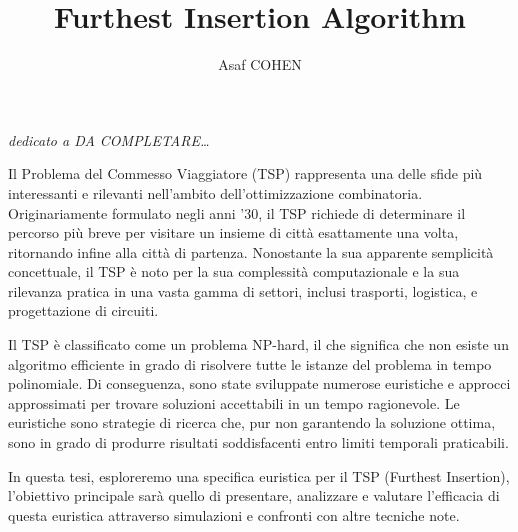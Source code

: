 \documentclass[a4paper,12pt]{report}
\begin{document}
\title{Furthest Insertion Algorithm}
\author{Asaf COHEN}
%
% 
%

\beforepreface

\clearpage
\null
\thispagestyle{empty}
\clearpage

        {\hfill \Large {\sl dedicato a DA COMPLETARE\dots}}
% 
%

\clearpage
\null
\thispagestyle{empty}
\clearpage

Il Problema del Commesso Viaggiatore (TSP) rappresenta una delle sfide più interessanti e rilevanti nell'ambito dell'ottimizzazione combinatoria. Originariamente formulato negli anni '30, il TSP richiede di determinare il percorso più breve per visitare un insieme di città esattamente una volta, ritornando infine alla città di partenza. Nonostante la sua apparente semplicità concettuale, il TSP è noto per la sua complessità computazionale e la sua rilevanza pratica in una vasta gamma di settori, inclusi trasporti,  logistica, e progettazione di circuiti.

Il TSP è classificato come un problema NP-hard, il che significa che non esiste un algoritmo efficiente in grado di risolvere tutte le istanze del problema in tempo polinomiale. Di conseguenza, sono state sviluppate numerose euristiche e approcci approssimati per trovare soluzioni accettabili in un tempo ragionevole. Le euristiche sono strategie di ricerca che, pur non garantendo la soluzione ottima, sono in grado di produrre risultati soddisfacenti entro limiti temporali praticabili.

In questa tesi, esploreremo una specifica euristica per il TSP (Furthest Insertion), l'obiettivo principale sarà quello di presentare, analizzare e valutare l'efficacia di questa euristica attraverso simulazioni e confronti con altre tecniche note.
\end{document}
